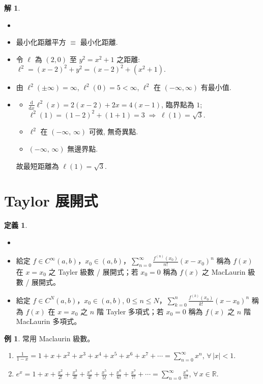 \documentclass[12pt]{extarticle}
\newcommand{\ds}{\displaystyle}
\newcommand{\ie}{\;\Longrightarrow\;}
\theoremstyle{definition}
\newtheorem*{dfn}{定義}
\newtheorem*{ex}{例}
\newtheorem*{sol}{解}
\newcommand{\diff}[2]{\frac{\mathrm{d} #1}{\mathrm{d} #2}}
\begin{document}
\begin{sol}
  \begin{itemize}\setlength\itemsep{0em}
    \item[]
    \item 最小化距離平方 $\equiv$ 最小化距離. 
    \item 令 $\ell$ 為 $(2, 0)$ 至 $y^2 = x^2 + 1$ 之距離: $\ds\ell^2 = (x - 2)^2 + y^2 = (x - 2)^2 + (x^2 + 1)$. 
    \item 由 $\ds\ell^2(\pm\infty)=\infty$, $\ds\ell^2(0) = 5 < \infty$, $\ell^2$ 在 $(-\infty, \infty)$ 有最小值. 
    \item 
      \begin{itemize}\setlength\itemsep{0em}
        \item $\ds\diff{}{x} \ell^2(x) = 2(x - 2) + 2x = 4(x - 1)$, 臨界點為 $1$; $\ell^2(1) = (1 - 2)^2 + (1 + 1) = 3\ie \ell(1) = \sqrt{3}$. 
        \item $\ell^2$ 在 $(-\infty,\,\infty)$ 可微, 無奇異點. 
        \item $(-\infty,\,\infty)$ 無邊界點. 
      \end{itemize}
      故最短距離為 $\ell(1) = \sqrt{3}$. 
    \end{itemize}
\end{sol}

\section*{Taylor 展開式}

\begin{dfn}
  \begin{itemize}\setlength{\itemsep}{0pt}
    \item[]
    \item 給定 $f\in C^\infty(a, b)$，$x_0\in(a, b)$，$\ds\sum_{n = 0}^\infty\frac{f^{(n)}(x_0)}{n!}(x - x_0)^n$ 稱為 $f(x)$ 在 $x = x_0$ 之 Tayler 級數 / 展開式；若 $x_0 = 0$ 稱為 $f(x)$ 之 MacLaurin 級數 / 展開式。
    \item 給定 $f\in C^N(a, b)$，$x_0\in(a, b)$, $0\leqslant n\leqslant N$，$\ds\sum_{k = 0}^n\frac{f^{(k)}(x_0)}{k!}(x - x_0)^n$ 稱為 $f(x)$ 在 $x = x_0$ 之 $n$ 階 Tayler 多項式；若 $x_0 = 0$ 稱為 $f(x)$ 之 $n$ 階 MacLaurin 多項式。
  \end{itemize}
\end{dfn}

\begin{ex} 常用 Maclaurin 級數。
  \begin{enumerate}\setlength{\itemsep}{-1pt}
    \item $\ds \frac{1}{1 - x} = 1 + x + x^2 + x^3 + x^4 + x^5 + x^6 + x^7 + \cdots = \sum_{n = 0}^\infty x^n$, $\forall\,|x| < 1$.
    \item $\ds e^x = 1 + x + \frac{x^2}{2!} + \frac{x^3}{3!} + \frac{x^4}{4!} + \frac{x^5}{5!} + \frac{x^6}{6!} + \frac{x^7}{7!} + \cdots = \sum_{n = 0}^\infty\frac{x^n}{n!}$, $\forall\,x\in\mathbb{R}$.
  \end{enumerate}
\end{ex}
\end{document}
